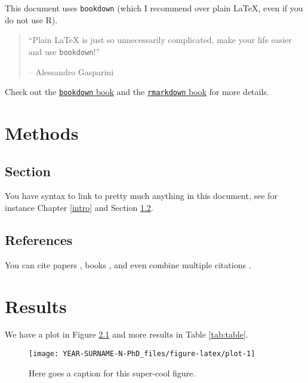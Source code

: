 \documentclass[
  12pt,
  oneside]{book}
\begin{document}
This document uses \texttt{bookdown} (which I recommend over plain \LaTeX, even if you do not use R).

\begin{quote}
``Plain \LaTeX{} is just so unnecessarily complicated, make your life easier and use \texttt{bookdown}!''

-- Alessandro Gasparini
\end{quote}

Check out the \href{https://bookdown.org/yihui/bookdown/}{\texttt{bookdown} book} and the \href{https://bookdown.org/yihui/rmarkdown/}{\texttt{rmarkdown} book} for more details.

\hypertarget{methods}{%
\chapter{Methods}\label{methods}}

\hypertarget{methods-section}{%
\section{Section}\label{methods-section}}

You have syntax to link to pretty much anything in this document, see for instance Chapter \ref{intro} and Section \ref{methods-references}.

\hypertarget{methods-references}{%
\section{References}\label{methods-references}}

You can cite papers \citep{gasparini_2018}, books \citep{brent_1973}, and even combine multiple citations \citep{R, scopus}.

\hypertarget{results}{%
\chapter{Results}\label{results}}

We have a plot in Figure \ref{fig:plot} and more results in Table \ref{tab:table}.

\begin{figure}

{\centering \texttt{[image: YEAR-SURNAME-N-PhD\_files/figure-latex/plot-1]} 

}

\caption{Here goes a caption for this super-cool figure.}\label{fig:plot}
\end{figure}
\end{document}
